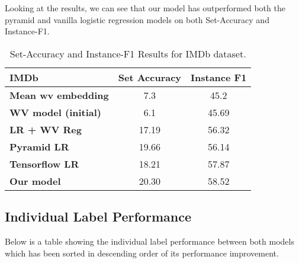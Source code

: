 Looking at the results, we can see that our model has outperformed both the pyramid and vanilla logistic regression models on both Set-Accuracy and Instance-F1.

\begin{table}[htbp]
\centering
\begin{tabular}{l|c|c}
IMDb & \textbf{Set Accuracy} & \textbf{Instance F1} \\ \hline
\textbf{Mean wv embedding} & 7.3 & 45.2 \\
\textbf{WV model (initial)} & 6.1 & 45.69 \\
\textbf{LR + WV Reg} & 17.19 & 56.32 \\
\textbf{Pyramid LR} & 19.66 & 56.14 \\
\textbf{Tensorflow LR} & 18.21 & 57.87 \\
\textbf{Our model} & 20.30 & 58.52
\end{tabular}
\caption{\label{tab:widgets}Set-Accuracy and Instance-F1 Results for IMDb dataset.}
\end{table}

\newpage
\subsection{Individual Label Performance}

Below is a table showing the individual label performance between both models which has been sorted in descending order of its performance improvement.\\

